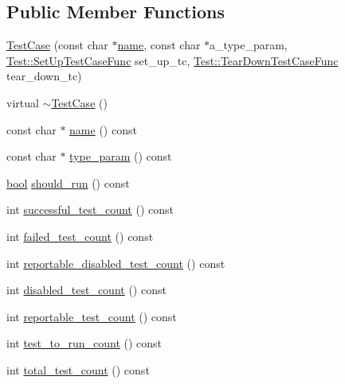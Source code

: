 \subsection*{Public Member Functions}
\begin{DoxyCompactItemize}
\item 
\hyperlink{classtesting_1_1TestCase_a8a43b04703bfc7d56597fcb9b76ffbf5}{Test\+Case} (const char $\ast$\hyperlink{classtesting_1_1TestCase_a3f1beb98d5f7e3b037a4ec82b64cc1cf}{name}, const char $\ast$a\+\_\+type\+\_\+param, \hyperlink{classtesting_1_1Test_a5f2a051d1d99c9b784c666c586186cf9}{Test\+::\+Set\+Up\+Test\+Case\+Func} set\+\_\+up\+\_\+tc, \hyperlink{classtesting_1_1Test_aa0f532e93b9f3500144c53f31466976c}{Test\+::\+Tear\+Down\+Test\+Case\+Func} tear\+\_\+down\+\_\+tc)
\item 
virtual \hyperlink{classtesting_1_1TestCase_a96ab68dd1f8f64a7087ac34ff64a2e46}{$\sim$\+Test\+Case} ()
\item 
const char $\ast$ \hyperlink{classtesting_1_1TestCase_a3f1beb98d5f7e3b037a4ec82b64cc1cf}{name} () const
\item 
const char $\ast$ \hyperlink{classtesting_1_1TestCase_a9df62c4104a4f856b477c9e8335bb689}{type\+\_\+param} () const
\item 
\hyperlink{classbool}{bool} \hyperlink{classtesting_1_1TestCase_a843d6cd43f3e587bfa8681990b9d59df}{should\+\_\+run} () const
\item 
int \hyperlink{classtesting_1_1TestCase_ab61929942a202f03903182866bd0e086}{successful\+\_\+test\+\_\+count} () const
\item 
int \hyperlink{classtesting_1_1TestCase_a70e26eb070c75ae62a191fa610ea234f}{failed\+\_\+test\+\_\+count} () const
\item 
int \hyperlink{classtesting_1_1TestCase_ad6b34335955967bc361b2fbacd2dd6c9}{reportable\+\_\+disabled\+\_\+test\+\_\+count} () const
\item 
int \hyperlink{classtesting_1_1TestCase_a8ef690ab8ec74d02c99416637de71ae8}{disabled\+\_\+test\+\_\+count} () const
\item 
int \hyperlink{classtesting_1_1TestCase_ae4e69f1a77b6aba274981e987e50acab}{reportable\+\_\+test\+\_\+count} () const
\item 
int \hyperlink{classtesting_1_1TestCase_a57f115315eb756e23be6651bb5e6c638}{test\+\_\+to\+\_\+run\+\_\+count} () const
\item 
int \hyperlink{classtesting_1_1TestCase_aba3cab19aaf7295284f0832f2cf895a3}{total\+\_\+test\+\_\+count} () const
\item 

\end{DoxyCompactItemize}
